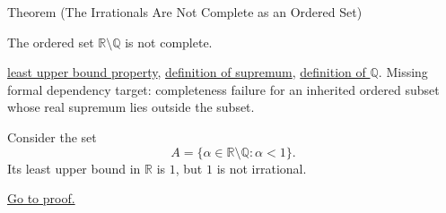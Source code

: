 \begin{theorembox}{Theorem (The Irrationals Are Not Complete as an Ordered Set)}
\begin{theorem}
\label{thm:irrationals-not-complete-as-ordered-set}
The ordered set $\mathbb{R}\setminus\mathbb{Q}$ is not complete.
\end{theorem}
\end{theorembox}
\begin{dependencies}
\hyperref[def:least-upper-bound-property]{least upper bound property},
\hyperref[def:supremum]{definition of supremum},
\hyperref[def:rationals]{definition of $\mathbb{Q}$}.
Missing formal dependency target: completeness failure for an inherited ordered
subset whose real supremum lies outside the subset.
\end{dependencies}
\begin{remark*}
Consider the set
\[
A=\{\alpha\in\mathbb{R}\setminus\mathbb{Q}:\alpha<1\}.
\]
Its least upper bound in $\mathbb{R}$ is $1$, but $1$ is not irrational.
\end{remark*}
\begin{remark*}[Proof]
\hyperref[prf:irrationals-not-complete-as-ordered-set]{Go to proof.}
\end{remark*}
